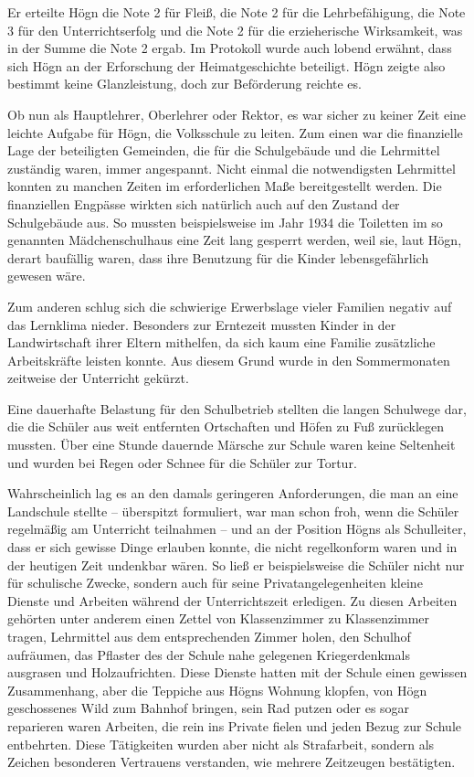 Er erteilte Högn die Note 2 für Fleiß, die Note 2 für die
Lehrbefähigung, die Note 3 für den Unterrichtserfolg und die Note 2 für
die erzieherische Wirksamkeit, was in der Summe die Note 2 ergab. Im
Protokoll wurde auch lobend erwähnt, dass sich Högn an der
Erforschung der Heimatgeschichte beteiligt. Högn zeigte also bestimmt
keine Glanzleistung, doch zur Beförderung reichte es.

Ob nun als Hauptlehrer, Oberlehrer oder Rektor, es war sicher zu keiner
Zeit eine leichte Aufgabe für Högn, die Volksschule zu leiten. Zum
einen war die finanzielle Lage der beteiligten Gemeinden, die für die
Schulgebäude und die Lehrmittel zuständig waren, immer angespannt.
Nicht einmal die notwendigsten Lehrmittel konnten zu manchen Zeiten
im erforderlichen Maße bereitgestellt werden. Die finanziellen
Engpässe wirkten sich natürlich auch auf den Zustand der Schulgebäude
aus. So mussten beispielsweise im Jahr 1934 die Toiletten im so
genannten Mädchenschulhaus eine Zeit lang gesperrt werden, weil sie,
laut Högn, derart baufällig waren, dass ihre Benutzung für die Kinder
lebensgefährlich gewesen wäre.

Zum anderen schlug sich die schwierige Erwerbslage vieler Familien
negativ auf das Lernklima nieder. Besonders zur Erntezeit mussten
Kinder in der Landwirtschaft ihrer Eltern mithelfen, da sich kaum eine
Familie zusätzliche Arbeitskräfte leisten konnte. Aus diesem Grund
wurde in den Sommermonaten zeitweise der Unterricht gekürzt.

Eine dauerhafte Belastung für den Schulbetrieb stellten die langen
Schulwege dar, die die Schüler aus weit entfernten Ortschaften und
Höfen zu Fuß zurücklegen mussten. Über eine Stunde dauernde Märsche zur
Schule waren keine Seltenheit und wurden bei Regen oder Schnee für die
Schüler zur Tortur.

Wahrscheinlich lag es an den damals geringeren Anforderungen, die man an
eine Landschule stellte – überspitzt formuliert, war man schon froh,
wenn die Schüler regelmäßig am Unterricht teilnahmen – und an der
Position Högns als Schulleiter, dass er sich gewisse Dinge erlauben
konnte, die nicht regelkonform waren und in der heutigen Zeit undenkbar
wären. So ließ er beispielsweise die Schüler nicht nur für schulische
Zwecke, sondern auch für seine Privatangelegenheiten kleine Dienste
und Arbeiten während der Unterrichtszeit erledigen. Zu diesen
Arbeiten gehörten unter anderem einen Zettel von Klassenzimmer zu
Klassenzimmer tragen, Lehrmittel aus dem entsprechenden Zimmer holen,
den Schulhof aufräumen, das Pflaster des der Schule nahe gelegenen
Kriegerdenkmals ausgrasen und Holzaufrichten. Diese Dienste hatten mit
der Schule einen gewissen Zusammenhang, aber die Teppiche aus Högns
Wohnung klopfen, von Högn geschossenes Wild zum Bahnhof bringen, sein
Rad putzen oder es sogar reparieren waren Arbeiten, die rein ins
Private fielen und jeden Bezug zur Schule entbehrten. Diese Tätigkeiten
wurden aber nicht als Strafarbeit, sondern als Zeichen besonderen
Vertrauens verstanden, wie mehrere Zeitzeugen bestätigten.


